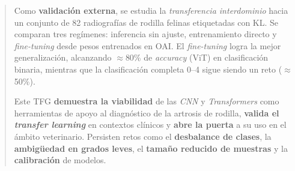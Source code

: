 \documentclass[11pt,spanish,listoffigures,listoftables]{tfgetsinf}
\begin{document}
\begin{abstract}
	Como \textbf{validación externa}, se estudia la \textit{transferencia
		interdominio} hacia un conjunto de 82 radiografías de rodilla felinas
	etiquetadas con KL. Se comparan tres regímenes: inferencia sin ajuste,
	entrenamiento directo y \textit{fine-tuning} desde pesos entrenados en OAI. El
	\textit{fine-tuning} logra la mejor generalización, alcanzando $\approx$80\% de
	\textit{accuracy} (ViT) en clasificación binaria, mientras que la clasificación
	completa 0--4 sigue siendo un reto ($\approx$50\%).

	Este TFG \textbf{demuestra la viabilidad} de las \textit{CNN} y
	\textit{Transformers} como herramientas de apoyo al diagnóstico de la artrosis
	de rodilla, \textbf{valida el \textit{transfer learning}} en contextos clínicos
	y \textbf{abre la puerta} a su uso en el ámbito veterinario. Persisten retos
	como el \textbf{desbalance de clases}, la \textbf{ambigüedad en grados leves},
	el \textbf{tamaño reducido de muestras} y la \textbf{calibración} de modelos.

\end{abstract}
\end{document}
